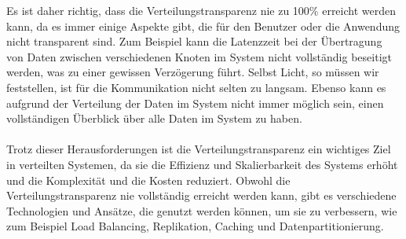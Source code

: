 Es ist daher richtig, dass die Verteilungstransparenz nie zu 100\% erreicht werden kann, da es immer einige Aspekte gibt, die für den Benutzer oder die Anwendung nicht transparent sind. Zum Beispiel kann die Latenzzeit bei der Übertragung von Daten zwischen verschiedenen Knoten im System nicht vollständig beseitigt werden, was zu einer gewissen Verzögerung führt.  Selbst Licht, so müssen wir feststellen, ist für die Kommunikation nicht selten zu langsam. Ebenso kann es aufgrund der Verteilung der Daten im System nicht immer möglich sein, einen vollständigen Überblick über alle Daten im System zu haben.
\\\\
Trotz dieser Herausforderungen ist die Verteilungstransparenz ein wichtiges Ziel in verteilten Systemen, da sie die Effizienz und Skalierbarkeit des Systems erhöht und die Komplexität und die Kosten reduziert. Obwohl die Verteilungstransparenz nie vollständig erreicht werden kann, gibt es verschiedene Technologien und Ansätze, die genutzt werden können, um sie zu verbessern, wie zum Beispiel Load Balancing, Replikation, Caching und Datenpartitionierung.

